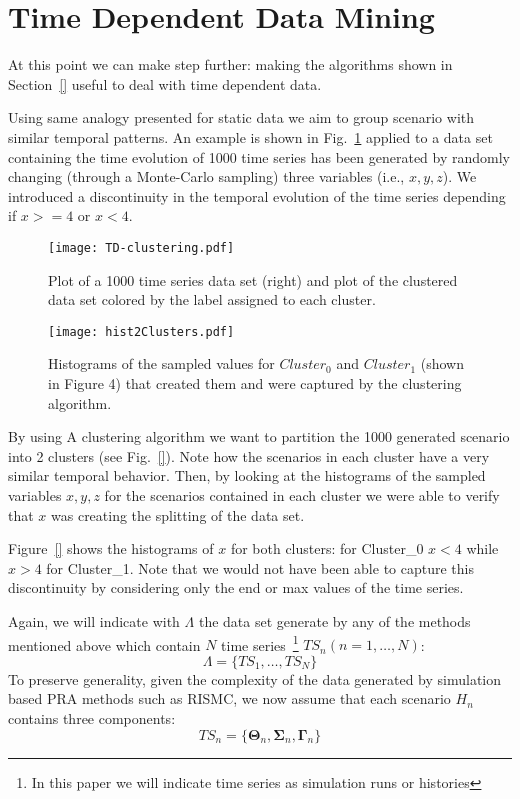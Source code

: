 \section{Time Dependent Data Mining}
\label{sec:timeDepDataMining}

At this point we can make step further: making 
the algorithms shown in Section~\ref{} useful to deal with time dependent data. 

Using same analogy presented for static data we aim to group scenario with similar 
temporal patterns.
An example is shown in Fig.~\ref{fig:TD-clustering} applied to a data set containing the time evolution 
of 1000 time series has been generated by randomly changing (through a Monte-Carlo 
sampling) three variables (i.e., $x,y,z$). 
We introduced a discontinuity in the temporal evolution of the time series 
depending if $x>=4$ or $x<4$.

\begin{figure}
    \centering
    \centerline{\texttt{[image: TD-clustering.pdf]}}
    \caption{Plot of a 1000 time series data set (right) and plot of the clustered data set colored 
             by the label assigned to each cluster.}
    \label{fig:TD-clustering}
\end{figure}

\begin{figure}
    \centering
    \centerline{\texttt{[image: hist2Clusters.pdf]}}
    \caption{Histograms of the sampled values for $Cluster_0$ and $Cluster_1$ (shown in Figure 4) that 
             created them and were captured by the clustering algorithm.}
    \label{fig:hist2Clusters}
\end{figure}

By using A clustering algorithm we want to partition the 1000 generated scenario into 
2 clusters (see Fig.~\ref{}). Note how the scenarios in each cluster have a very similar 
temporal behavior. Then, by looking at the histograms of the sampled variables $x,y,z$ 
for the scenarios contained in each cluster we were able to verify that $x$ was creating 
the splitting of the data set. 

Figure~\ref{} shows the histograms of $x$ for both clusters: 
for Cluster\_0 $x<4$ while $x>4$ for Cluster\_1. Note that we would not have been able to capture 
this discontinuity by considering only the end or max values of the time series.

Again, we will indicate with $\Lambda$ the data set generate by any of the methods mentioned above 
which contain $N$ time series~\footnote{In this paper we will indicate time series as simulation 
runs or histories} 
$TS_n (n=1,\ldots,N)$:
\begin{equation}
  \Lambda = \{ TS_1,\ldots,TS_N \}  
  \label{eq:collectionTS}
\end{equation}
To preserve generality, given the complexity of the data generated by simulation based PRA 
methods such as RISMC, we now assume that each scenario $Η_n$ contains three components: 
\begin{equation}
  TS_n = \{ \bm{\Theta}_n,\bm{\Sigma}_n,\bm{\Gamma}_n \}  
  \label{eq:collectionTS}
\end{equation}

